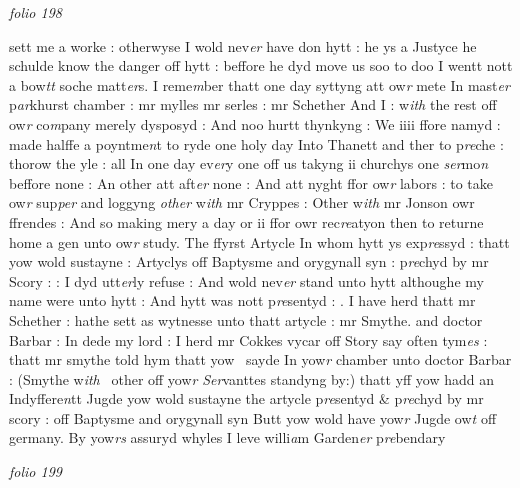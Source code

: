 \documentclass[12pt, a4paper]{book}
\begin{document}
\dotfill
					

\textit{folio 198}
      				
      				
      				sett me a worke : otherwyse I wold nev\textit{er} have don hytt : he ys a Justyce he schulde know the danger off hytt : beffore he dyd move us soo to doo I wentt nott a bow\textit{tt} soche matt\textit{er}s.  I reme\textit{m}ber thatt one day syttyng att ow\textit{r} mete In mast\textit{er} p\textit{ar}khurst chamber : mr mylles mr serles : mr Schether And I : w\textit{ith} the rest off ow\textit{r} co\textit{m}pany merely dysposyd : And noo hurtt thynkyng : We iiii ffore namyd : made halffe a poyntme\textit{n}t to ryde one holy day Into Thanett and ther to p\textit{re}che : thorow the yle : all In one day ev\textit{er}y one off us takyng ii churchys one \textit{ser}mo\textit{n} beffore none : An other att aft\textit{er }none : And att nyght ffor ow\textit{r} labors : to take  ow\textit{r} sup\textit{per} and loggyng \textit{other} w\textit{ith} mr Cryppes : Other w\textit{ith} mr Jonson owr ffrendes : And so making mery a day or ii ffor owr rec\textit{re}atyon then to returne home a gen unto ow\textit{r} study.  The ffyrst Artycle In whom hytt ys exp\textit{re}ssyd : thatt yow wold sustayne : Artyclys off Baptysme and orygynall syn : p\textit{re}chyd by mr Scory : : I dyd utt\textit{er}ly refuse : And wold nev\textit{er} stand unto hytt althoughe my name were unto hytt : And hytt was nott p\textit{re}sentyd : . I have herd thatt mr Schether : hathe sett as wytnesse unto thatt artycle : mr Smythe. and doctor Barbar : In dede my lord : I herd mr Cokkes vycar off Story say often tym\textit{es} : thatt mr smythe told hym 
			thatt yow  sayde In yow\textit{r} chamber unto doctor Barbar : (Smythe w\textit{ith}  other off yow\textit{r}
      				\textit{Ser}vanttes standyng by:) thatt yff yow hadd an Indyffere\textit{n}tt Jugde yow wold sustayne the artycle p\textit{re}sentyd \& p\textit{re}chyd by mr scory : off Baptysme and orygynall syn Butt yow wold have yow\textit{r }Jugde ow\textit{t} off germany. By yow\textit{rs} assuryd whyles I leve willi\textit{a}m Garden\textit{er} p\textit{re}bendary
      				
\dotfill
					

\textit{folio 199}
      				
\end{document}
